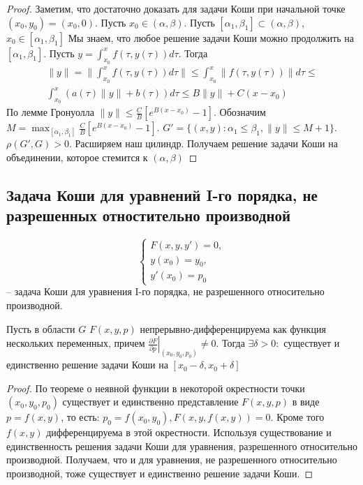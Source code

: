 \documentclass[document.tex]{subfiles}
\begin{document}
\begin{proof}
    Заметим, что достаточно доказать для задачи Коши при начальной точке $(x_0, y_0) = (x_0, 0)$. Пусть $x_0 \in
    (\alpha, \beta)$. Пусть $[\alpha_1, \beta_1] \subset (\alpha, \beta)$, $x_0 \in [\alpha_1, \beta_1]$ Мы знаем, что
    любое решение задачи Коши можно продолжить на $[\alpha_1, \beta_1]$. Пусть $y = \int_{x_0}^{x}f(\tau, y(\tau))
    d\tau$. Тогда
    \begin{multline*}
        \|y\| = \| \int_{x_0}^{x}f(\tau, y(\tau)) d\tau \| \leq \int_{x_0}^{x} \|f(\tau, y(\tau))\| d\tau \leq \\
        \int_{x_0}^{x}(a(\tau)\|y\| + b(\tau)) d \tau \leq B \|y\| + C(x - x_0)
    \end{multline*}
    По лемме Гронуолла $\|y\| \leq \frac{C}{B} \left[ e^{B(x - x_0)} - 1 \right]$. Обозначим $M = \max_{[\alpha_1,
    \beta_1]} \frac{C}{B} \left[ e^{B(x - x_0)} - 1 \right]$. $G' = \{(x, y) : \alpha_1 \leq \beta_1, \|y\| \leq M +
    1\}$. $\rho(G', G) > 0$. Расширяем наш цилиндр. Получаем решение задачи Коши на объединении, которое стемится к
    $(\alpha, \beta)$
\end{proof}

\subsection{Задача Коши для уравнений I-го порядка, не разрешенных отностительно производной}

\begin{definition}
    \[
        \begin{cases}
            F(x, y, y') = 0, \\
            y(x_0) = y_0, \\
            y'(x_0) = p_0
        \end{cases}
    \] -- задача Коши для уравнения I-го порядка, не разрешенного относительно производной.
\end{definition}

\begin{theorem}
    Пусть в области $G$ $F(x, y, p)$ непрерывно-дифференцируема как функция нескольких переменных, причем
    $\left. \frac{\partial F}{\partial p} \right|_(x_0, y_0, p_0) \neq 0$. Тогда $\exists \delta > 0:$ существует и
    единственно решение задачи Коши на $[x_0 - \delta, x_0 + \delta]$
\end{theorem}

\begin{proof}
    По теореме о неявной функции в некоторой окрестности точки $(x_0, y_0, p_0)$ существует и единственно представление
    $F(x, y, p)$ в виде $p = f(x, y)$, то есть: $p_0 = f(x_0, y_0), F(x, y, f(x, y)) = 0$. Кроме того $f(x, y)$
    дифференцируема в этой окрестности. Используя существование и единственность решения задачи Коши для уравнения,
    разрешенного относительно производной. Получаем, что и для уравнения, не разрешенного относительно производной, тоже
    существует и единственно решение задачи Коши.
\end{proof}
\end{document}

